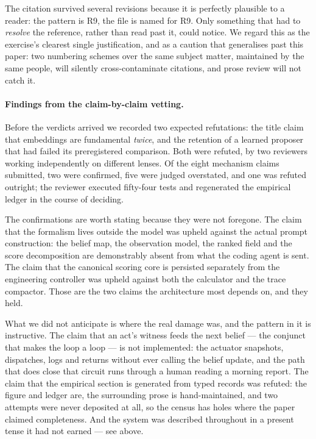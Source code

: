 The citation survived several revisions because it is perfectly plausible to a
reader: the pattern is R9, the file is named for R9.  Only something that had to
\emph{resolve} the reference, rather than read past it, could notice.  We regard
this as the exercise's clearest single justification, and as a caution that
generalises past this paper: two numbering schemes over the same subject matter,
maintained by the same people, will silently cross-contaminate citations, and
prose review will not catch it.

\paragraph{Findings from the claim-by-claim vetting.}
Before the verdicts arrived we recorded two expected refutations: the title
claim that embeddings are fundamental \emph{twice}, and the retention of a
learned proposer that had failed its preregistered comparison.  Both were
refuted, by two reviewers working independently on different lenses.  Of the
eight mechanism claims submitted, two were confirmed, five were judged
overstated, and one was refuted outright; the reviewer executed fifty-four tests
and regenerated the empirical ledger in the course of deciding.

The confirmations are worth stating because they were not foregone.  The claim
that the formalism lives outside the model was upheld against the actual prompt
construction: the belief map, the observation model, the ranked field and the
score decomposition are demonstrably absent from what the coding agent is sent.
The claim that the canonical scoring core is persisted separately from the
engineering controller was upheld against both the calculator and the trace
compactor.  Those are the two claims the architecture most depends on, and they
held.

What we did not anticipate is where the real damage was, and the pattern in it
is instructive.  The claim that an act's witness feeds the next belief --- the
conjunct that makes the loop a loop --- is not implemented: the actuator
snapshots, dispatches, logs and returns without ever calling the belief update,
and the path that does close that circuit runs through a human reading a morning
report.  The claim that the empirical section is generated from typed records
was refuted: the figure and ledger are, the surrounding prose is hand-maintained,
and two attempts were never deposited at all, so the census has holes where the
paper claimed completeness.  And the system was described throughout in a
present tense it had not earned --- see above.

